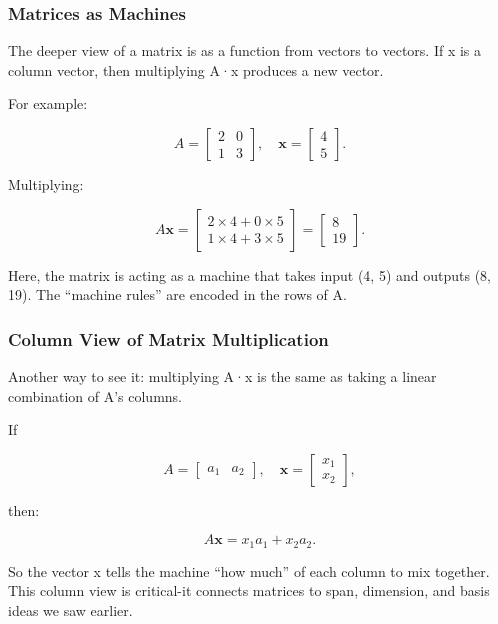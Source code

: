 \documentclass[
  letterpaper,
  DIV=11,
  numbers=noendperiod]{scrreprt}
\begin{document}
\subsubsection{Matrices as Machines}\label{matrices-as-machines}

The deeper view of a matrix is as a function from vectors to vectors. If
x is a column vector, then multiplying A·x produces a new vector.

For example:

\[
A = \begin{bmatrix} 
2 & 0 \\ 
1 & 3 
\end{bmatrix}, \quad
\mathbf{x} = \begin{bmatrix} 
4 \\ 
5 
\end{bmatrix}.
\]

Multiplying:

\[
A\mathbf{x} = \begin{bmatrix} 
2×4 + 0×5 \\ 
1×4 + 3×5 
\end{bmatrix} 
= \begin{bmatrix} 
8 \\ 
19 
\end{bmatrix}.
\]

Here, the matrix is acting as a machine that takes input (4, 5) and
outputs (8, 19). The ``machine rules'' are encoded in the rows of A.

\subsubsection{Column View of Matrix
Multiplication}\label{column-view-of-matrix-multiplication}

Another way to see it: multiplying A·x is the same as taking a linear
combination of A's columns.

If

\[
A = \begin{bmatrix} 
a_1 & a_2 
\end{bmatrix}, \quad \mathbf{x} = \begin{bmatrix} 
x_1 \\ 
x_2 
\end{bmatrix},
\]

then:

\[
A\mathbf{x} = x_1 a_1 + x_2 a_2.
\]

So the vector x tells the machine ``how much'' of each column to mix
together. This column view is critical-it connects matrices to span,
dimension, and basis ideas we saw earlier.
\end{document}
